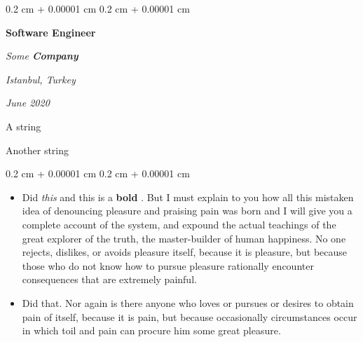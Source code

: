 \documentclass[10pt, letterpaper]{article}
\newenvironment{summary}{
    \begin{description}[
        topsep=0.10 cm,
        parsep=0.10 cm,
        partopsep=0pt,
        itemsep=0pt,
        leftmargin=0.4 cm + 10pt
    ]
}{
    \end{description}
} %
\newenvironment{highlights}{
    \begin{itemize}[
        topsep=0.10 cm,
        parsep=0.10 cm,
        partopsep=0pt,
        itemsep=0pt,
        leftmargin=0.4 cm + 10pt
    ]
}{
    \end{itemize}
} %
\newenvironment{onecolentry}{
    \begin{adjustwidth}{
        0.2 cm + 0.00001 cm
    }{
        0.2 cm + 0.00001 cm
    }
}{
    \end{adjustwidth}
} %
\newenvironment{twocolentry}[2][]{
    \onecolentry
    \def\secondColumn{#2}
    \setcolumnwidth{\fill, 4.5 cm}
    \begin{paracol}{2}
}{
    \switchcolumn \raggedleft \secondColumn
    \end{paracol}
    \endonecolentry
} %
\let\hrefWithoutArrow\href
\renewcommand{\href}[2]{\hrefWithoutArrow{#1}{\ifthenelse{\equal{#2}{}}{ }{#2 }\raisebox{.15ex}{\footnotesize \faExternalLink*}}}
\begin{document}
        \begin{twocolentry}{
        \textit{Istanbul, Turkey}    
            
        \textit{June 2020}}
            \textbf{Software Engineer}
            
            \textit{Some \textbf{Company}}
        \end{twocolentry}
            \begin{summary}
                \item A string
                \item Another string
            \end{summary}
        \vspace{0.10 cm}
        \begin{onecolentry}
            \begin{highlights}
                \item Did \textit{this} and this is a \textbf{bold} \href{https://example.com}{link}. But I must explain to you how all this mistaken idea of denouncing pleasure and praising pain was born and I will give you a complete account of the system, and expound the actual teachings of the great explorer of the truth, the master-builder of human happiness. No one rejects, dislikes, or avoids pleasure itself, because it is pleasure, but because those who do not know how to pursue pleasure rationally encounter consequences that are extremely painful.
                \item Did that. Nor again is there anyone who loves or pursues or desires to obtain pain of itself, because it is pain, but because occasionally circumstances occur in which toil and pain can procure him some great pleasure.
            \end{highlights}
        \end{onecolentry}


        \vspace{0.2 cm}
\end{document}
